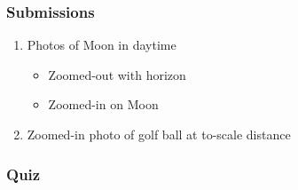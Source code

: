 \documentclass[12pt]{article}
\begin{document}
\subsubsection{Submissions}
\begin{enumerate}
    \item Photos of Moon in daytime
    \begin{itemize}
        \item Zoomed-out with horizon
        \item Zoomed-in on Moon
    \end{itemize}
    \item Zoomed-in photo of golf ball at to-scale distance
\end{enumerate}

\subsubsection{Quiz}
\end{document}
